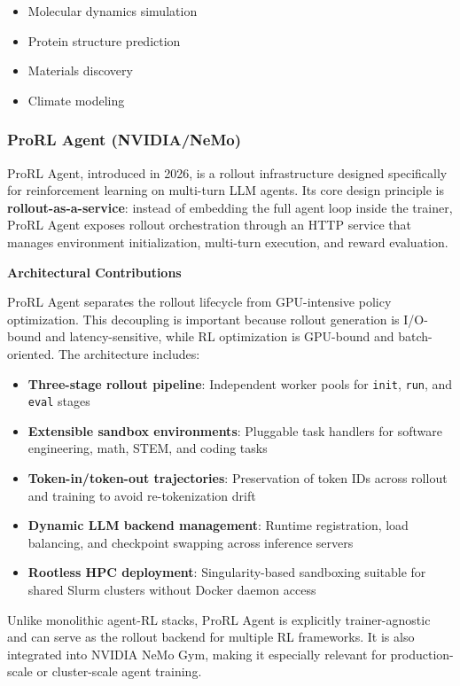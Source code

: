 \begin{itemize}
    \item Molecular dynamics simulation
    \item Protein structure prediction
    \item Materials discovery
    \item Climate modeling

\end{itemize}
\subsubsection{ProRL Agent (NVIDIA/NeMo)}

ProRL Agent, introduced in 2026, is a rollout infrastructure designed specifically for reinforcement learning on multi-turn LLM agents. Its core design principle is \textbf{rollout-as-a-service}: instead of embedding the full agent loop inside the trainer, ProRL Agent exposes rollout orchestration through an HTTP service that manages environment initialization, multi-turn execution, and reward evaluation.

\textbf{Architectural Contributions}

ProRL Agent separates the rollout lifecycle from GPU-intensive policy optimization. This decoupling is important because rollout generation is I/O-bound and latency-sensitive, while RL optimization is GPU-bound and batch-oriented. The architecture includes:

\begin{itemize}
    \item \textbf{Three-stage rollout pipeline}: Independent worker pools for \texttt{init}, \texttt{run}, and \texttt{eval} stages
    \item \textbf{Extensible sandbox environments}: Pluggable task handlers for software engineering, math, STEM, and coding tasks
    \item \textbf{Token-in/token-out trajectories}: Preservation of token IDs across rollout and training to avoid re-tokenization drift
    \item \textbf{Dynamic LLM backend management}: Runtime registration, load balancing, and checkpoint swapping across inference servers
    \item \textbf{Rootless HPC deployment}: Singularity-based sandboxing suitable for shared Slurm clusters without Docker daemon access

\end{itemize}
Unlike monolithic agent-RL stacks, ProRL Agent is explicitly trainer-agnostic and can serve as the rollout backend for multiple RL frameworks. It is also integrated into NVIDIA NeMo Gym, making it especially relevant for production-scale or cluster-scale agent training.


